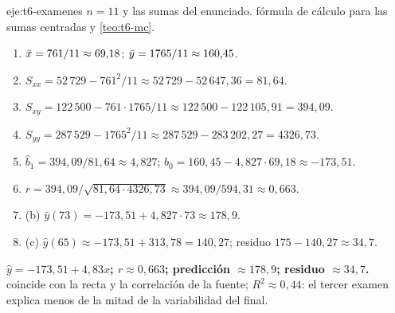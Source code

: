 \begin{solucion}{eje:t6-examenes}
\datos $n=11$ y las sumas del enunciado.
\planteamiento fórmula de cálculo para las sumas centradas y \cref{teo:t6-mc}.
\pasos
\begin{enumerate}[label=\arabic*.]
  \item $\bar{x}=761/11\approx69{,}18$; $\bar{y}=1765/11\approx160{,}45$.
  \item $S_{xx}=52\,729-761^{2}/11\approx52\,729-52\,647{,}36=81{,}64$.
  \item $S_{xy}=122\,500-761\cdot1765/11\approx122\,500-122\,105{,}91=394{,}09$.
  \item $S_{yy}=287\,529-1765^{2}/11\approx287\,529-283\,202{,}27=4326{,}73$.
  \item $\widehat b_1=394{,}09/81{,}64\approx4{,}827$; $\widehat b_0=160{,}45-4{,}827\cdot69{,}18\approx-173{,}51$.
  \item $r=394{,}09/\sqrt{81{,}64\cdot4326{,}73}\approx394{,}09/594{,}31\approx0{,}663$.
  \item (b) $\widehat y(73)=-173{,}51+4{,}827\cdot73\approx178{,}9$.
  \item (c) $\widehat y(65)\approx-173{,}51+313{,}78=140{,}27$; residuo $175-140{,}27\approx34{,}7$.
\end{enumerate}
\resultado \textbf{$\widehat y=-173{,}51+4{,}83x$; $r\approx0{,}663$; predicción $\approx178{,}9$; residuo $\approx34{,}7$.}
\comprobacion coincide con la recta y la correlación de la fuente; $R^{2}\approx0{,}44$: el tercer examen explica menos de la mitad de la variabilidad del final.
\end{solucion}

